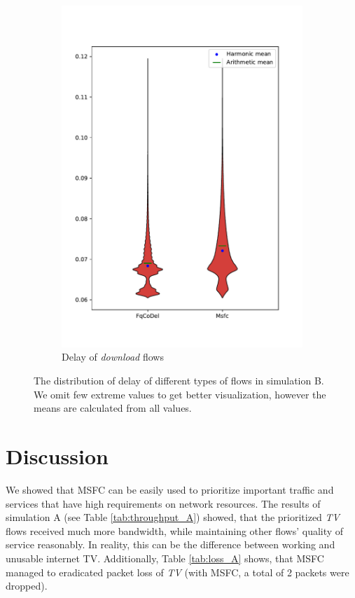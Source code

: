 \begin{figure}
\begin{subfigure}[b]{0.475\textwidth}
		\includegraphics[width=\textwidth]{drawings/type5-delay-down_B}
		\caption[]%
		{{\small Delay of \emph{download} flows}}    
		\label{fig:delay_download_B}
	\end{subfigure}
	\caption[]
	{\small The distribution of delay of different types of flows in simulation B. We omit few extreme values to get better visualization, however the means are calculated from all values.} 
	\label{fig:delay_flows_B}
\end{figure}



\section{Discussion}

We showed that MSFC can be easily used to prioritize important traffic and services that have high requirements on network resources. The results of simulation A (see Table \ref{tab:throughput_A}) showed, that the prioritized \emph{TV} flows received much more bandwidth, while maintaining other flows' quality of service reasonably. In reality, this can be the difference between working and unusable internet TV. Additionally, Table \ref{tab:loss_A} shows, that MSFC managed to eradicated packet loss of \emph{TV} (with MSFC, a total of 2 packets were dropped). 

